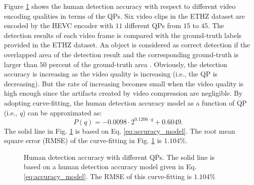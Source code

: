 \documentclass[journal]{IEEEtran}
\begin{document}
Figure \ref{fig:accuracy} shows the human detection accuracy with respect to different video encoding qualities in terms of the QPs. Six video clips in the ETHZ dataset \cite{ELSG08} are encoded by the HEVC encoder \cite{X265} with $11$ different QPs from $15$ to $45$. The detection results of each video frame is compared with the ground-truth labels provided in the ETHZ dataset. An object is considered as correct detection if the overlapped area of the detection result and the corresponding ground-truth is larger than $50$ percent of the ground-truth area \cite{FGMR10}. Obviously, the detection accuracy is increasing as the video quality is increasing (i.e., the QP is decreasing). But the rate of increasing becomes small when the video quality is high enough since the artifacts created by video compression are negligible. By adopting curve-fitting, the human detection accuracy model as a function of QP (i.e., $q$) can be approximated as:
\begin{equation}\label{eq:accuracy_model}
P\left(q\right) = -0.0098\cdot 2^{0.1206\cdot q}+0.6049.
\end{equation}
The solid line in Fig. \ref{fig:accuracy} is based on Eq. \eqref{eq:accuracy_model}. The root mean square error (RMSE) of the curve-fitting in Fig. \ref{fig:accuracy} is $1.104\%$.


\begin{figure}[t]
\caption{Human detection accuracy with different QPs. The solid line is based on a human detection accuracy model given in Eq. \eqref{eq:accuracy_model}. The RMSE of this curve-fitting is $1.104\%$}\label{fig:accuracy}
\end{figure}
\end{document}
